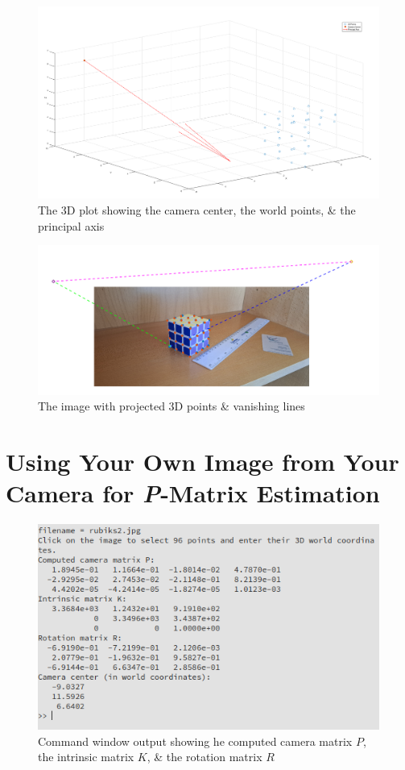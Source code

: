 \documentclass[a4paper]{article}
\begin{document}
\begin{figure}[H]
    \centering
    \includegraphics[width=\textwidth]{./images/1.2.png}
    \caption{ The 3D plot showing the camera center, the world points, \& the principal axis }
\end{figure}

\begin{figure}[H]
    \centering
    \includegraphics[width=\textwidth]{./images/1.3.png}
    \caption{ The image with projected 3D points \& vanishing lines }
\end{figure}

\section{Using Your Own Image from Your Camera for \textit{P}-Matrix Estimation}
\begin{figure}[H]
    \centering
    \includegraphics[width=\textwidth]{./images/2.1.png}
    \caption{ Command window output showing he computed camera matrix $P$, the intrinsic matrix $K$, \& the rotation matrix $R$ }
\end{figure}
\end{document}
